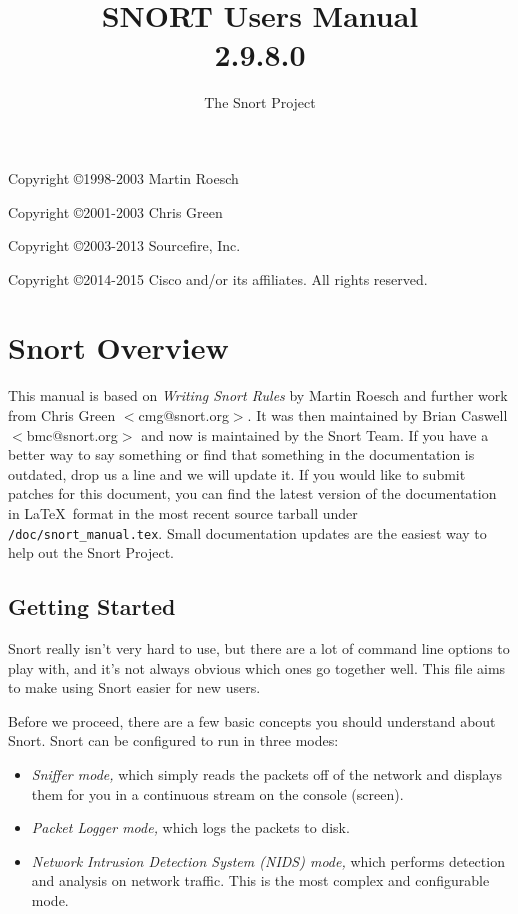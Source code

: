 \documentclass[english]{report}
\begin{document}
\title{SNORT\textsuperscript{\textregistered} Users Manual\\2.9.8.0}

\author{The Snort Project}

\maketitle

\newpage

Copyright \copyright 1998-2003 Martin Roesch

Copyright \copyright 2001-2003 Chris Green

Copyright \copyright 2003-2013 Sourcefire, Inc.

Copyright \copyright 2014-2015 Cisco and/or its affiliates. All rights reserved.

\tableofcontents{}

\chapter{Snort Overview}

This manual is based on \emph{Writing Snort Rules} by Martin Roesch and further
work from Chris Green $<$cmg@snort.org$>$.  It was then maintained by Brian
Caswell $<$bmc@snort.org$>$ and now is maintained by the Snort Team.  If you
have a better way to say something or find that something in the documentation
is outdated, drop us a line and we will update it.  If you would like to submit
patches for this document, you can find the latest version of the documentation
in \LaTeX\ format in the most recent source tarball under
\verb!/doc/snort_manual.tex!.  Small documentation updates are the easiest way
to help out the Snort Project.

\section{Getting Started}

Snort really isn't very hard to use, but there are a lot of command line
options to play with, and it's not always obvious which ones go together well.
This file aims to make using Snort easier for new users.

Before we proceed, there are a few basic concepts you should understand about
Snort. Snort can be configured to run in three modes:

\begin{itemize}

\item {\em Sniffer mode,} which simply reads the packets off of the network and
displays them for you in a continuous stream on the console (screen). 

\item {\em Packet Logger mode,} which logs the packets to disk. 

\item {\em Network Intrusion Detection System (NIDS) mode,} which performs
detection and analysis on network traffic. This is the most complex and
configurable mode.

\end{itemize}
\end{document}
